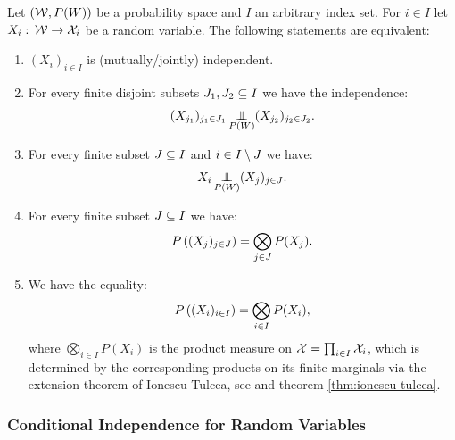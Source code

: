 \begin{Exc}
    Let $(\mathcal{W},P(W))$ be a probability space and $I$ an arbitrary index set. 
    For $i \in I$ let $X_i:\, \mathcal{W} \to \mathcal{X}_i$ be a random variable. 
    The following statements are equivalent:
    \begin{enumerate}
    \item  $(X_i)_{i \in I}$ is (mutually/jointly) independent.
    \item For every finite disjoint subsets $J_1,J_2 \subseteq I$ we have the independence:
        \[ (X_{j_1})_{j_1 \in J_1} \operatorname*{\perp\mkern-11mu\perp}_{P(W)} (X_{j_2})_{j_2 \in J_2}.\]
    \item For every finite subset $J \subseteq I$ and $i \in I \setminus J$ we have:
           \[ X_i \operatorname*{\perp\mkern-11mu\perp}_{P(W)} (X_j)_{j \in J}.\]
    \item For every finite subset $J \subseteq I$ we have:
           \[ P\left ( (X_j)_{j \in J} \right ) = \bigotimes_{j \in J} P(X_j).\]
    \item We have the equality:
            \[ P\left ( (X_i)_{i \in I} \right ) = \bigotimes_{ i \in I} P(X_i),\]
            where $\bigotimes_{ i \in I} P(X_i)$ is the product measure on $\mathcal{X} = \prod_{ i \in I} \mathcal{X}_i$, which is determined by the corresponding products on its finite marginals via the extension theorem of Ionescu-Tulcea, see \cite{Tul49, Lam87} and theorem \ref{thm:ionescu-tulcea}.
    \end{enumerate}
\end{Exc}


\subsubsection{Conditional Independence for Random Variables}


